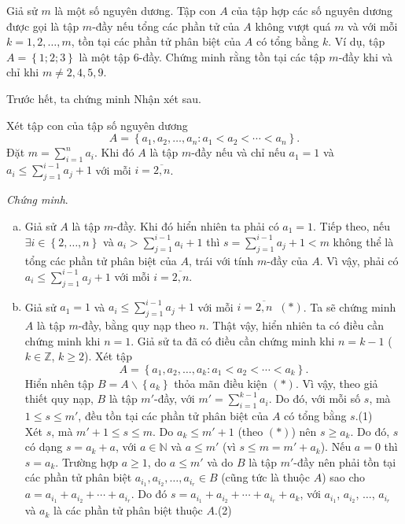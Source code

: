 \begin{bt}%
	Giả sử $m$ là một số nguyên dương. Tập con $A$ của tập hợp các số nguyên dương được gọi là tập $m$-đầy nếu tổng các phần tử của $A$ không vượt quá $m$ và với mỗi $k=1,2,\ldots,m$, tồn tại các phần tử phân biệt của $A$ có tổng bằng $k$. Ví dụ, tập $A=\left\{1;2;3\right\}$ là một tập $6$-đầy. Chứng minh rằng tồn tại các tập $m$-đầy khi và chỉ khi $m\ne 2,4,5,9$.
	\loigiai
	{
		Trước hết, ta chứng minh Nhận xét sau.
		\begin{nx}
			Xét tập con của tập số nguyên dương $$A=\left\{a_1,a_2,\ldots,a_n: a_1<a_2<\cdots<a_n\right\}.$$
			Đặt $m=\displaystyle\sum\limits_{i=1}^{n}a_i$. Khi đó $A$ là tập $m$-đầy nếu và chỉ nếu $a_1=1$ và $a_i\le \displaystyle\sum\limits_{j=1}^{i-1}a_j+1$ với mỗi $i=\overline{2,n}$.
		\end{nx}
		\textit{Chứng minh}.\begin{enumerate}[a)]
			\item Giả sử $A$ là tập $m$-đầy. Khi đó hiển nhiên ta phải có $a_1=1$. Tiếp theo, nếu $\exists i\in \left\{2,\ldots,n\right\}$ và $a_i> \displaystyle\sum\limits_{j=1}^{i-1}a_i+1$ thì $s=\displaystyle\sum\limits_{j=1}^{i-1}a_j+1<m$ không thể là tổng các phần tử phân biệt của $A$, trái với tính $m$-đầy của $A$. Vì vậy, phải có $a_i\le \displaystyle\sum\limits_{j=1}^{i-1}a_j+1$ với mỗi $i=\overline{2,n}$.\\
			\item Giả sử $a_1=1$ và $a_i\le \displaystyle\sum\limits_{j=1}^{i-1}a_j+1$ với mỗi $i=\overline{2,n}\;\;(\ast)$. Ta sẽ chứng minh $A$ là tập $m$-đầy, bằng quy nạp theo $n$.
			Thật vậy, hiển nhiên ta có điều cần chứng minh khi $n=1$. Giả sử ta đã có điều cần chứng minh khi $n=k-1$ ($k\in\mathbb{Z}$, $k\ge 2$). Xét tập $$A=\left\{a_1,a_2,\ldots,a_k: a_1<a_2<\cdots<a_k\right\}.$$
			Hiển nhên tập $B=A\backslash \left\{a_k\right\}$ thỏa mãn điều kiện $(\ast)$. Vì vậy, theo giả thiết quy nạp, $B$ là tập $m'$-đầy, với $m'=\displaystyle\sum\limits_{i=1}^{k-1}a_i$. Do đó, với mỗi số $s$, mà $1\le s\le m'$, đều tồn tại các phần tử phân biệt của $A$ có tổng bằng $s$.\hfill(1)\\
			Xét $s$, mà $m'+1\le s\le m$. Do $a_k\le m'+1$ (theo $(\ast)$) nên $s\ge a_k$. Do đó, $s$ có dạng $s=a_k+a$, với $a\in\mathbb{N}$ và $a\le m'$ (vì $s\le m=m'+a_k$). Nếu $a=0$ thì $s=a_k$. Trường hợp $a\ge 1$, do $a\le m'$ và do $B$ là tập $m'$-đầy nên phải tồn tại các phần tử phân biệt $a_{i_1}, a_{i_2},\ldots, a_{i_r}\in B$ (cũng tức là thuộc $A$) sao cho $a=a_{i_1}+ a_{i_2}+\cdots+a_{i_r}$. Do đó $s=a_{i_1}+ a_{i_2}+\cdots+a_{i_r}+a_k$, với $a_{i_1}$, $a_{i_2}$, $\ldots$, $a_{i_r}$ và $a_k$ là các phần tử phân biệt thuộc $A$.\hfill(2)\\

\end{enumerate}}
\end{bt}
